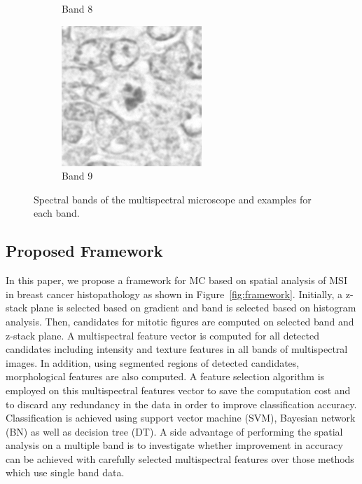 \documentclass[10pt,twocolumn,letterpaper]{article}
\begin{document}
\begin{figure}[t]
\begin{subfigure}[b]{0.11\textwidth}
		\caption*{Band 8}
	\end{subfigure}
	\begin{subfigure}[b]{0.11\textwidth}
		\centering
		\includegraphics[width=\textwidth]{img/M03_00a_0908_m1.png}
		\caption*{Band 9}
	\end{subfigure}
	\caption{Spectral bands of the multispectral microscope and examples for each band.}
	\label{fig:spectral_bands}	
\end{figure}

\subsection{Proposed Framework}
In this paper, we propose a framework for MC based on spatial analysis of MSI in breast cancer histopathology as shown in Figure~\ref{fig:framework}. Initially, a z-stack plane is selected based on gradient and band is selected based on histogram analysis. Then, candidates for mitotic figures are computed on selected band and z-stack plane. A multispectral feature vector is computed for all detected candidates including intensity and texture features in all bands of multispectral images. In addition, using segmented regions of detected candidates, morphological features are also computed. A feature selection algorithm is employed on this multispectral features vector to save the computation cost and to discard any redundancy in the data in order to improve classification accuracy. Classification is achieved using support vector machine (SVM), Bayesian network (BN) as well as decision tree (DT). A side advantage of performing the spatial analysis on a multiple band is to investigate whether improvement in accuracy can be achieved with carefully selected multispectral features over those methods \cite{masood2009,wu2009,wu2012} which use single band data.
\end{document}
